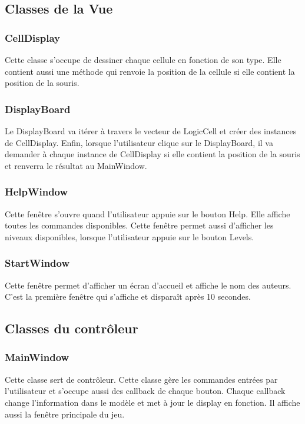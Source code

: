\documentclass[utf8]{article}
\begin{document}
\begin{large}
\subsection{Classes de la Vue}
\subsubsection{CellDisplay}
\indent
\par
Cette classe s'occupe de dessiner chaque cellule en fonction de son type. Elle
contient aussi une méthode qui renvoie la position de la cellule si elle
contient la position de la souris.
\par
\subsubsection{DisplayBoard}
\indent
\par
Le DisplayBoard va itérer à travers le vecteur de LogicCell et créer des
instances de CellDisplay. Enfin, lorsque l'utilisateur clique sur le
DisplayBoard, il va demander à chaque instance de CellDisplay si elle
contient la position de la souris et renverra le résultat au MainWindow.
\par
\subsubsection{HelpWindow}
\indent
\par
Cette fenêtre s'ouvre quand l'utilisateur appuie sur le bouton Help. Elle
affiche toutes les commandes disponibles. Cette fenêtre permet aussi d'afficher
les niveaux disponibles, lorsque l'utilisateur appuie sur le bouton Levels.
\par
\subsubsection{StartWindow}
\indent
\par
Cette fenêtre permet d'afficher un écran d'accueil et affiche le nom des
auteurs. C'est la première fenêtre qui s'affiche et disparaît après 10 secondes.
\par

\subsection{Classes du contrôleur}
\subsubsection{MainWindow}
\indent
\par
Cette classe sert de contrôleur. Cette classe gère les commandes entrées par
l'utilisateur et s'occupe aussi des callback de chaque bouton. Chaque callback
change l'information dans le modèle et met à jour le display en fonction. Il
affiche aussi la fenêtre principale du jeu.
\par

\end{large}
\end{document}
